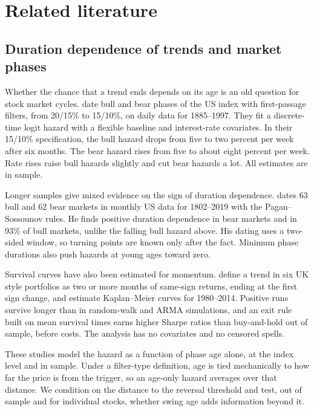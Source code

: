 \section{Related literature}\label{sec:lit}

\subsection{Duration dependence of trends and market phases}

Whether the chance that a trend ends depends on its age is an old question for stock market cycles.
\citet{LundeTimmermann2004} date bull and bear phases of the US index with first-passage filters,
from 20/15\% to 15/10\%, on daily data for 1885--1997. They fit a discrete-time logit hazard with a
flexible baseline and interest-rate covariates. In their 15/10\% specification, the bull hazard drops
from five to two percent per week after six months. The bear hazard rises from five to about eight
percent per week. Rate rises raise bull hazards slightly and cut bear hazards a lot. All estimates
are in sample.

Longer samples give mixed evidence on the sign of duration dependence. \citet{Zakamulin2023} dates
63 bull and 62 bear markets in monthly US data for 1802--2019 with the Pagan--Sossounov rules. He
finds positive duration dependence in bear markets and in 93\% of bull markets, unlike the falling
bull hazard above. His dating uses a two-sided window, so turning points are known only after the
fact. Minimum phase durations also push hazards at young ages toward zero.

Survival curves have also been estimated for momentum. \citet{Sarwar2018} define a trend in six UK
style portfolios as two or more months of same-sign returns, ending at the first sign change, and
estimate Kaplan--Meier curves for 1980--2014. Positive runs survive longer than in random-walk and
ARMA simulations, and an exit rule built on mean survival times earns higher Sharpe ratios than
buy-and-hold out of sample, before costs. The analysis has no covariates and no censored spells.

These studies model the hazard as a function of phase age alone, at the index level and in sample.
Under a filter-type definition, age is tied mechanically to how far the price is from the trigger,
so an age-only hazard averages over that distance. We condition on the distance to the reversal
threshold and test, out of sample and for individual stocks, whether swing age adds information
beyond it.

